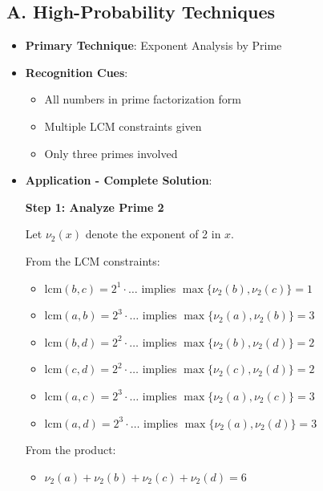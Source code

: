 \documentclass[12pt]{article}
\begin{document}
\begin{techniquesbox}
\subsection*{A. High-Probability Techniques}
\begin{itemize}[leftmargin=*]
    \item \textbf{Primary Technique}: Exponent Analysis by Prime
    \item \textbf{Recognition Cues}: 
    \begin{itemize}
        \item All numbers in prime factorization form
        \item Multiple LCM constraints given
        \item Only three primes involved
    \end{itemize}
    \item \textbf{Application - Complete Solution}: 
    
    \textbf{Step 1: Analyze Prime 2}
    
    Let $\nu_2(x)$ denote the exponent of 2 in $x$.
    
    From the LCM constraints:
    \begin{itemize}
        \item $\text{lcm}(b,c) = 2^1 \cdot \ldots$ implies $\max\{\nu_2(b), \nu_2(c)\} = 1$
        \item $\text{lcm}(a,b) = 2^3 \cdot \ldots$ implies $\max\{\nu_2(a), \nu_2(b)\} = 3$
        \item $\text{lcm}(b,d) = 2^2 \cdot \ldots$ implies $\max\{\nu_2(b), \nu_2(d)\} = 2$
        \item $\text{lcm}(c,d) = 2^2 \cdot \ldots$ implies $\max\{\nu_2(c), \nu_2(d)\} = 2$
        \item $\text{lcm}(a,c) = 2^3 \cdot \ldots$ implies $\max\{\nu_2(a), \nu_2(c)\} = 3$
        \item $\text{lcm}(a,d) = 2^3 \cdot \ldots$ implies $\max\{\nu_2(a), \nu_2(d)\} = 3$
    \end{itemize}
    
    From the product:
    \begin{itemize}
        \item $\nu_2(a) + \nu_2(b) + \nu_2(c) + \nu_2(d) = 6$
    \end{itemize}
    

\end{itemize}
\end{techniquesbox}
\end{document}
